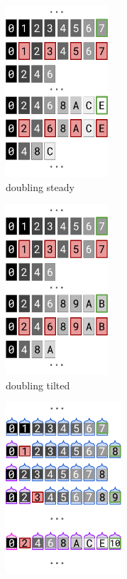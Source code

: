 \begin{figure}
\begin{subfigure}{0.25\linewidth}
\centering
\includegraphics[height=2.5in]{img/surface-control-naive-steady}
\caption{doubling steady}
\label{fig:surface-control:naive-steady}
\end{subfigure}%
\begin{subfigure}{0.25\linewidth}
\centering
\includegraphics[height=2.5in]{img/surface-control-naive-tilted}
\caption{doubling tilted}
\label{fig:surface-control:naive-tilted}
\end{subfigure}%
\begin{subfigure}{0.25\linewidth}
\centering
\includegraphics[height=2.5in]{img/surface-control-zhao-steady}

\end{subfigure}
\end{figure}
